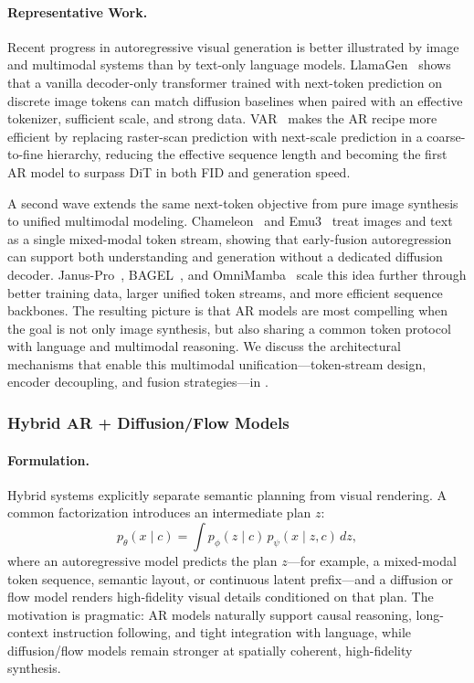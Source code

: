 \documentclass{llmxive}
\begin{document}
\paragraph{Representative Work.}
Recent progress in autoregressive visual generation is better illustrated by image and multimodal systems than by text-only language models. LlamaGen~\citep{sun2024autoregressive} shows that a vanilla decoder-only transformer trained with next-token prediction on discrete image tokens can match diffusion baselines when paired with an effective tokenizer, sufficient scale, and strong data. VAR~\citep{tian2024visual} makes the AR recipe more efficient by replacing raster-scan prediction with next-scale prediction in a coarse-to-fine hierarchy, reducing the effective sequence length and becoming the first AR model to surpass DiT in both FID and generation speed.

A second wave extends the same next-token objective from pure image synthesis to unified multimodal modeling. Chameleon~\citep{chameleon2024} and Emu3~\citep{wang2024emu3} treat images and text as a single mixed-modal token stream, showing that early-fusion autoregression can support both understanding and generation without a dedicated diffusion decoder. Janus-Pro~\citep{chen2025janusprounifiedmultimodalunderstanding}, BAGEL~\citep{deng2025bagelemerging}, and OmniMamba~\citep{zou2025omnimamba} scale this idea further through better training data, larger unified token streams, and more efficient sequence backbones. The resulting picture is that AR models are most compelling when the goal is not only image synthesis, but also sharing a common token protocol with language and multimodal reasoning. We discuss the architectural mechanisms that enable this multimodal unification---token-stream design, encoder decoupling, and fusion strategies---in .

\subsubsection{Hybrid AR + Diffusion/Flow Models}
\label{sec:hybrid_ar_diff}

\paragraph{Formulation.}
Hybrid systems explicitly separate semantic planning from visual rendering. A common factorization introduces an intermediate plan $z$:
\begin{equation}
p_{\theta}(x \mid c) = \int p_{\phi}(z \mid c)\, p_{\psi}(x \mid z, c)\, dz,
\end{equation}
where an autoregressive model predicts the plan $z$---for example, a mixed-modal token sequence, semantic layout, or continuous latent prefix---and a diffusion or flow model renders high-fidelity visual details conditioned on that plan. The motivation is pragmatic: AR models naturally support causal reasoning, long-context instruction following, and tight integration with language, while diffusion/flow models remain stronger at spatially coherent, high-fidelity synthesis.
\end{document}
